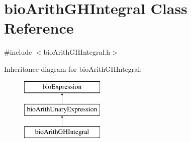\hypertarget{classbio_arith_g_h_integral}{}\section{bio\+Arith\+G\+H\+Integral Class Reference}
\label{classbio_arith_g_h_integral}


{\ttfamily \#include $<$bio\+Arith\+G\+H\+Integral.\+h$>$}

Inheritance diagram for bio\+Arith\+G\+H\+Integral\+:\begin{figure}[H]
\begin{center}
\leavevmode
\includegraphics[height=3.000000cm]{classbio_arith_g_h_integral}
\end{center}
\end{figure}
